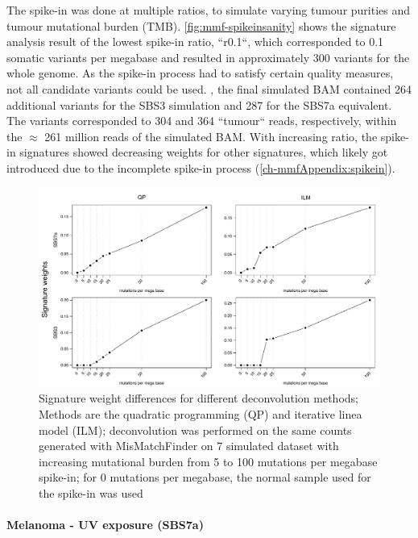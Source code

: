 The spike-in was done at multiple ratios, to simulate varying tumour purities and tumour mutational burden (TMB). \autoref{fig:mmf-spikeinsanity} shows the signature analysis result of the lowest spike-in ratio, ``r0.1``, which corresponded to 0.1 somatic variants per megabase and resulted in approximately 300 variants for the whole genome. As the spike-in process had to satisfy certain quality measures, not all candidate variants could be used. , the final simulated BAM contained 264 additional  variants for the SBS3 simulation and 287 for the SBS7a equivalent. The variants corresponded to 304 and 364 ``tumour`` reads, respectively, within the $\approx$ 261 million reads of the simulated BAM. With increasing ratio, the spike-in signatures showed decreasing weights for other signatures, which likely got introduced due to the incomplete spike-in process (\autoref{ch-mmfAppendix:spikein}).


\begin{figure}[ht]
\centering
\includegraphics[width=.99\linewidth]{Figures/MisMatchFinder/deconstructionMethodsDifferences.pdf}
\caption[Signature weight differences for different deconvolution methods]{Signature weight differences for different deconvolution methods; Methods are the quadratic programming (QP) and iterative linea model (ILM); deconvolution was performed on the same counts generated with MisMatchFinder on 7 simulated dataset with increasing mutational burden from 5 to 100 mutations per megabase spike-in; for 0 mutations per megabase, the normal sample used for the spike-in was used}\label{fig:mmf-methodDifferences}
\end{figure}


\paragraph{Melanoma - UV exposure (SBS7a)}
\label{mmf-sec:melaSim}

